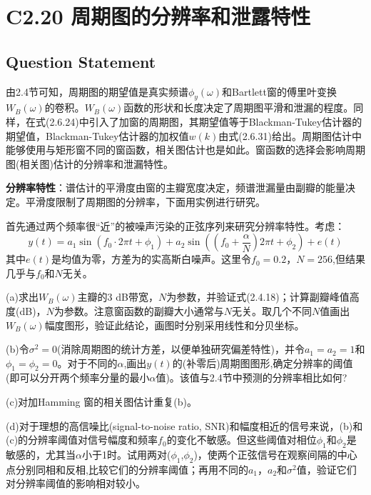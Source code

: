 \documentclass[UTF-8, a4paper, 12pt]{ctexart}
\begin{document}
\newpage
\section{C2.20 周期图的分辨率和泄露特性}

\subsection{Question Statement}

由2.4节可知，周期图的期望值是真实频谱$\phi_y (\omega) $和Bartlett窗的傅里叶变换$W_B(\omega)$的卷积。$W_B(\omega)$函数的形状和长度决定了周期图平滑和泄漏的程度。同样，在式(2.6.24)中引入了加窗的周期图，其期望值等于Blackman-Tukey估计器的期望值，Blackman-Tukey估计器的加权值$w(k)$由式(2.6.31)给出。周期图估计中能够使用与矩形窗不同的窗函数，相关图估计也是如此。窗函数的选择会影响周期图(相关图)估计的分辨率和泄漏特性。
\newline

{\bfseries 分辨率特性}：谱估计的平滑度由窗的主瓣宽度决定，频谱泄漏量由副瓣的能量决定。平滑度限制了周期图的分辨率，下面用实例进行研究。

首先通过两个频率很“近”的被噪声污染的正弦序列来研究分辨率特性。考虑：
\begin{equation}
    y(t)=a_1\sin(f_0\cdot 2\pi t+\phi_1)+a_2\sin((f_0+\frac{\alpha}{N})2\pi t+\phi_2)+e(t)
\end{equation}
其中$e(t)$是均值为零，方差为的实高斯白噪声。这里令$f_0=0.2$，$N = 256$,但结果几乎与$f_0$和$N$无关。

(a)求出$W_B(\omega)$主瓣的3 dB带宽，$N$为参数，并验证式(2.4.18)；计算副瓣峰值高度(dB)，$N$为参数。注意窗函数的副瓣大小通常与$N$无关。取几个不同$N$值画出$W_B(\omega)$幅度图形，验证此结论，画图时分别采用线性和分贝坐标。

(b)令$\sigma^2=0$(消除周期图的统计方差，以便单独研究偏差特性)，并令$a_1= a_2=1$和$\phi_1=\phi_2=0$。对于不同的$\alpha$,画出$y(t)$的(补零后)周期图图形,确定分辨率的阈值(即可以分开两个频率分量的最小$\alpha$值)。该值与2.4节中预测的分辨率相比如何?

(c)对加Hamming 窗的相关图估计重复(b)。

(d)对于理想的高信噪比(signal-to-noise ratio, SNR)和幅度相近的信号来说，(b)和(c)的分辨率阈值对信号幅度和频率$f_0$的变化不敏感。但这些阈值对相位$\phi_1$和$\phi_2$是敏感的，尤其当$\alpha$小于1时。试用两对($\phi_1$,$\phi_2$)，使两个正弦信号在观察间隔的中心点分别同相和反相,比较它们的分辨率阈值；再用不同的$a_1$，$a_2$和$\sigma^2$值，验证它们对分辨率阈值的影响相对较小。\newline
\end{document}
